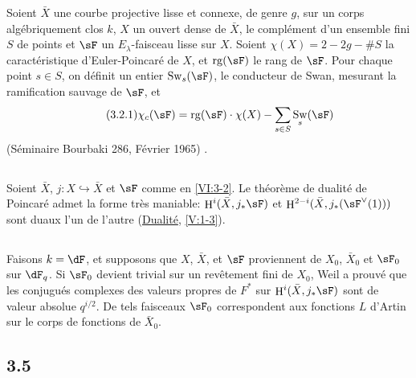 \documentclass[oneside]{book}
\DeclareMathOperator{\h}{H}
\DeclareMathOperator{\swan}{Sw}
\theoremstyle{sga-source}
\theoremstyle{sga-source-dash}
\theoremstyle{sga-source-dotdash}
\theoremstyle{sga-source-number-note-dash}
\theoremstyle{sga-source-note-number-dotdash}
\theoremstyle{sga-source-example-dotdash}
\theoremstyle{sga-source-inline-number}
\theoremstyle{sga-source-bare-number}
\theoremstyle{sga-source}
\newcommand{\PrintPage}[1]{}\newcommand{\MathPage}[1]{}\newcommand{\PrintCite}[2]{#1}\newcommand{\var}[3]{#2}
\begin{document}
Soient $\bar X$ une courbe projective lisse et connexe, de genre $g$, sur un 
corps algébriquement clos $k$, $X$ un ouvert dense de $\bar X$, 
le complément d'un ensemble fini $S$ de points et $\sF$ un 
$E_\lambda$-faisceau lisse sur $X$. Soient $\chi(X)=2-2 g-\# S$ la 
caractéristique d'Euler-Poincaré de $X$, et $\operatorname{rg}(\sF)$ le 
rang de $\sF$. Pour chaque point $s\in S$, on définit un entier 
$\swan_s(\sF)$, le conducteur de Swan, mesurant la ramification sauvage de 
$\sF$, et 
\begin{align*}\tag{3.2.1}\label{VI:eq:3-2-1}
  \chi_c(\sF) = \operatorname{rg}(\sF) \cdot \chi(X) - \sum_{s\in S} \swan_s(\sF) 
\end{align*}
(Séminaire Bourbaki 286, Février 1965) \cite{ra65}. 





\subsection{}\label{VI:3-3}

Soient $\bar X$, $j:X\hookrightarrow\bar X$ et $\sF$ comme en \ref{VI:3-2}. Le 
théorème de dualité de Poincaré admet la forme très maniable: 
$\h^i(\bar X,j_\ast \sF)$ et $\var{\h^{2-i}(\bar X,j_\ast(\sF^\vee(1))}{\h^{2-i}(\bar X,j_\ast(\sF^\vee(1)))}{S45-SOL-0757}$ sont 
duaux l'un de l'autre (\hyperref[V]{Dualité}, \ref{V:1-3}). 





\PrintPage{190}
\subsection{}\label{VI:3-4}

Faisons $k=\dF$, et supposons que $X$, $\bar X$, et $\sF$ proviennent de 
$X_0$, $\bar X_0$ et $\sF_0$ sur $\dF_q$. Si $\sF_0$ devient trivial sur un 
revêtement fini de $X_0$, Weil a prouvé que les conjugués complexes des 
valeurs propres de $F^\ast$ sur $\h^i(\bar X,j_\ast\sF)$ sont de valeur 
absolue $q^{i/2}$. De tels faisceaux $\sF_0$ correspondent aux fonctions $L$ 
d'Artin sur le corps de fonctions de $\bar X_0$. 





\subsection*{3.5}\label{VI:3-5_} %
\end{document}
